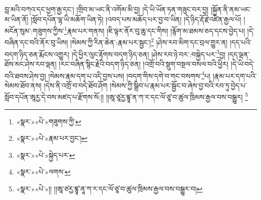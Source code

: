 བླ་མའི་བཀའ་དང་ཕྱག་རྒྱ་དང་། །གྲིབ་མ་ཡང་ནི་འགོམ་མི་བྱ། །དེ་ཡི་ཡོན་ཏན་གཟུང་བར་བྱ། །སྐྱོན་ནི་ནམ་ཡང་མ་ཡིན་ནོ། །སློབ་དཔོན་ལྷ་ཡི་མཆོག་ཡིན་ཏེ། །འབད་པས་མཆོད་པར་བྱ་བ་ཡིན། །དེ་ཉིད་རྡོ་རྗེ་འཛིན་རྒྱལ་པོ། །མངོན་སུམ་:གཟུགས་ཀྱིས་\footnote{«སྣར་»«པེ་»གཟུགས་ཀྱི་}རྣམ་པར་གནས། །ཇི་ལྟར་ནོར་བུ་ཆུ་དང་གིས། །རྙོག་མ་ཐམས་ཅད་དངས་བྱེད་པ། །དེ་བཞིན་དང་བའི་ནོར་བུ་ཡིས། །སེམས་ཀྱི་རིན་ཆེན་:རྣམ་པར་སྦྱང་།\footnote{«སྣར་»«པེ་»རྣམ་པར་བྱང་།} །ཤེས་རབ་མིག་དང་བྲལ་གྱུར་ན། །དད་པའི་བདག་ཉིད་ཅན་རྨོངས་འགྱུར། །དེ་ཕྱིར་ལུང་རྟོགས་བདག་ཉིད་ཅན། །ཤེས་རབ་ཉེ་བར་:བསྐྱེད་པར་\footnote{«སྣར་»«པེ་»སྐྱེད་པར་}བྱ། །དད་ལྡན་ཐོས་མང་ཤེས་རབ་ལྡན། །རང་བཞིན་སྙིང་རྗེའི་བདག་ཉིད་ཅན། །འགྲོ་བའི་སྡུག་བསྔལ་བསལ་བའི་ཕྱིར། །དེ་ཡི་བདེ་བའི་ཐབས་ཤེས་བྱ། །སེམས་རྣམ་དག་པ་འདི་བྱས་པས། །བདག་གིས་དགེ་བ་གང་བསགས་\footnote{«སྣར་»«པེ་»ལགས་}པ། །རྣམ་པར་དག་པའི་སེམས་ཐོབ་ནས། །དེས་ནི་འགྲོ་བ་བདེ་ཐོབ་ཤོག །སེམས་ཀྱི་སྒྲིབ་པ་རྣམ་པར་སྦྱོང་བ་ཞེས་བྱ་བའི་རབ་ཏུ་བྱེད་པ་སློབ་དཔོན་ཨཱརྱ་དེ་བས་མཛད་པ་རྫོགས་སོ:།། །།ཨཱ་ཙཱརྱ་ཛྙཱ་ན་ཀ་ར་དང་ལོ་ཙཱ་བ་ཚུལ་ཁྲིམས་རྒྱལ་བས་བསྒྱུར། \footnote{«སྣར་»«པེ་»།། །།ཨཱ་ཙརྱ་ཛྙཱ་ནཱ་ཀ་ར་དང་ལོ་ཙཱ་བ་ཚུལ་ཁྲིམས་རྒྱལ་བས་བསྒྱུར་བ། }